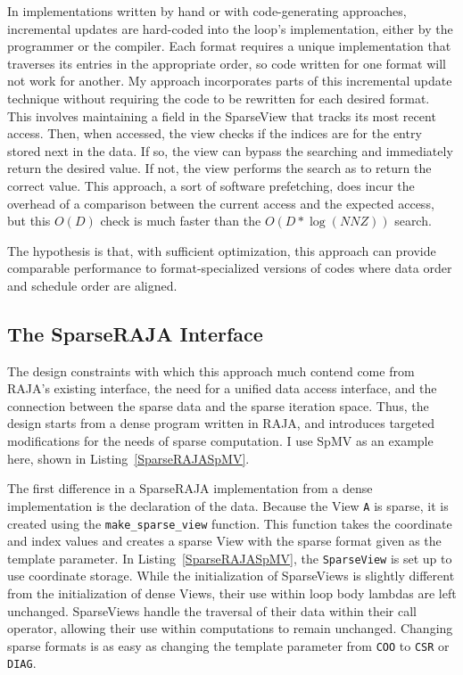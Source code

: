In implementations written by hand or with code-generating approaches, incremental updates are hard-coded into the loop's implementation, either by the programmer or the compiler.
Each format requires a unique implementation that traverses its entries in the appropriate order, so code written for one format will not work for another.
My approach incorporates parts of this incremental update technique without requiring the code to be rewritten for each desired format. 
This involves maintaining a field in the SparseView that tracks its most recent access.
Then, when accessed, the view checks if the indices are for the entry stored next in the data. 
If so, the view can bypass the searching and immediately return the desired value. 
If not, the view performs the search as to return the correct value. 
This approach, a sort of software prefetching, does incur the overhead of a comparison between the current access and the expected access, but this $O(D)$ check is much faster than the $O(D*\log(NNZ))$ search.

The hypothesis is that, with sufficient optimization, this approach can provide comparable performance to format-specialized versions of codes where data order and schedule order are aligned.

\subsection{The SparseRAJA Interface}

The design constraints with which this approach much contend come from RAJA's existing interface, the need for a unified data access interface, and the connection between the sparse data and the sparse iteration space.
Thus, the design starts from a dense program written in RAJA, and introduces targeted modifications for the needs of sparse computation.
I use SpMV as an example here, shown in Listing~\ref{SparseRAJASpMV}.

The first difference in a SparseRAJA implementation from a dense implementation is the declaration of the data.
Because the View \verb.A. is sparse, it is created using the \verb.make_sparse_view. function.
This function takes the coordinate and index values and creates a sparse View with the sparse format given as the template parameter. 
In Listing~\ref{SparseRAJASpMV}, the \verb.SparseView. is set up to use coordinate storage.
While the initialization of SparseViews is slightly different from the initialization of dense Views, their use within loop body lambdas are left unchanged. 
SparseViews handle the traversal of their data within their call operator, allowing their use within computations to remain unchanged.
Changing sparse formats is as easy as changing the template parameter from \verb.COO. to \verb.CSR. or \verb.DIAG..

